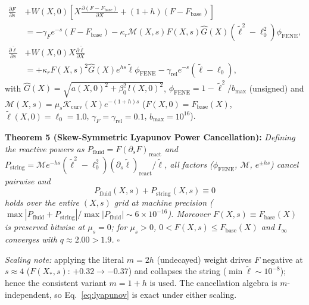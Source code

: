 \documentclass[12pt,a4paper]{article}
\begin{document}
\begin{equation}
\begin{split}
\frac{\partial F}{\partial s} &+ W(X,0) \left[ X \frac{\partial (F - F_{\mathrm{base}})}{\partial X} + (1+h)(F - F_{\mathrm{base}}) \right] \\
&= -\gamma_F e^{-s}(F - F_{\mathrm{base}}) - \kappa_r \mathcal{M}(X, s) F(X, s) \hat{G}(X) (\tilde{\ell}^2 - \ell_0^2) \phi_{\mathrm{FENE}}, \\
\frac{\partial \tilde{\ell}}{\partial s} &+ W(X,0) X \frac{\partial \tilde{\ell}}{\partial X} \\
&= +\kappa_r F(X, s)^2 \hat{G}(X) e^{h s} \tilde{\ell} \phi_{\mathrm{FENE}} - \gamma_{\mathrm{rel}} e^{-s}(\tilde{\ell} - \ell_0),
\end{split}
\label{eq:twofield}
\end{equation}
with $\hat{G}(X) = \sqrt{a(X,0)^2 + \beta_0^2 \, l(X,0)^2}$, $\phi_{\mathrm{FENE}} = 1 - \tilde{\ell}^2/b_{\max}$ (unsigned) and $\mathcal{M}(X, s) = \mu_s \mathcal{K}_{\mathrm{curv}}(X) e^{-(1+h)s}$ ($F(X,0) = F_{\mathrm{base}}(X)$, $\tilde{\ell}(X,0) = \ell_0 = 1.0$, $\gamma_F = \gamma_{\mathrm{rel}} = 0.1$, $b_{\max} = 10^{16}$).

\textbf{Theorem 5 (Skew-Symmetric Lyapunov Power Cancellation):} \textit{Defining the reactive powers as $P_{\mathrm{fluid}} = F(\partial_s F)_{\mathrm{react}}$ and $P_{\mathrm{string}} = \mathcal{M}e^{-hs}(\tilde{\ell}^2-\ell_0^2)(\partial_s\tilde{\ell})_{\mathrm{react}}/\tilde{\ell}$, all factors ($\phi_{\mathrm{FENE}}$, $\mathcal{M}$, $e^{\pm hs}$) cancel pairwise and}
\begin{equation}
P_{\mathrm{fluid}}(X, s) + P_{\mathrm{string}}(X, s) \equiv 0
\label{eq:lyapunov}
\end{equation}
\textit{holds over the entire $(X, s)$ grid at machine precision ($\max|P_{\mathrm{fluid}} + P_{\mathrm{string}}|/\max|P_{\mathrm{fluid}}| \sim 6 \times 10^{-16}$). Moreover $F(X, s) \equiv F_{\mathrm{base}}(X)$ is preserved bitwise at $\mu_s = 0$; for $\mu_s > 0$, $0 < F(X, s) \le F_{\mathrm{base}}(X)$ and $I_\infty$ converges with $q \approx 2.00 > 1.9$. $\square$}

\textit{Scaling note:} applying the literal $m = 2h$ (undecayed) weight drives $F$ negative at $s \approx 4$ ($F(X_*, s)$: $+0.32 \to -0.37$) and collapses the string ($\min \tilde{\ell} \sim 10^{-8}$); hence the consistent variant $m = 1+h$ is used. The cancellation algebra is $m$-independent, so Eq.~\eqref{eq:lyapunov} is exact under either scaling.
\end{document}
